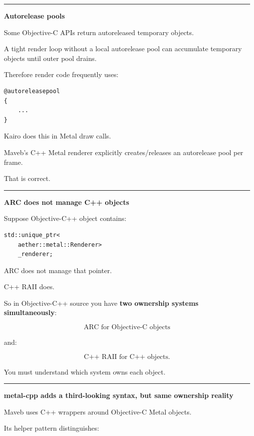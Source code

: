 \begin{center}\rule{0.5\linewidth}{0.5pt}\end{center}

\textbf{Autorelease pools}

Some Objective-C APIs return autoreleased temporary objects.

A tight render loop without a local autorelease pool can accumulate temporary objects until outer pool drains.

Therefore render code frequently uses:

\begin{verbatim}
@autoreleasepool
{
    ...
}
\end{verbatim}

Kairo does this in Metal draw calls.

Maveb's C++ Metal renderer explicitly creates/releases an autorelease pool per frame.

That is correct.

\begin{center}\rule{0.5\linewidth}{0.5pt}\end{center}

\textbf{ARC does not manage C++ objects}

Suppose Objective-C++ object contains:

\begin{verbatim}
std::unique_ptr<
    aether::metal::Renderer>
    _renderer;
\end{verbatim}

ARC does not manage that pointer.

C++ RAII does.

So in Objective-C++ source you have \textbf{two ownership systems simultaneously}:

\[
\boxed{
\text{ARC for Objective-C objects}
}
\]

and:

\[
\boxed{
\text{C++ RAII for C++ objects}.
}
\]

You must understand which system owns each object.

\begin{center}\rule{0.5\linewidth}{0.5pt}\end{center}

\textbf{metal-cpp adds a third-looking syntax, but same ownership reality}

Maveb uses C++ wrappers around Objective-C Metal objects.

Its helper pattern distinguishes:

